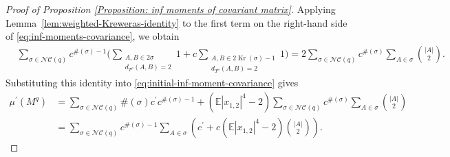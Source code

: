 \documentclass{article}
\theoremstyle{definition}
\newcommand{\NC}{\mathcal{NC}}
\begin{document}
{\begin{proof}[Proof of Proposition \ref{Proposition: inf moments of covariant matrix}]
Applying Lemma~\ref{lem:weighted-Kreweras-identity} to the first
term on the right-hand side of
\eqref{eq:inf-moments-covariance}, we obtain
\begin{align*}
&\sum_{\sigma\in\NC(q)}
c^{\#(\sigma)-1}
\Bigg(
\sum_{\substack{A,B\in 2\sigma\\
d_{T^\rho}(A,B)=2}}
1
+
c\sum_{\substack{A,B\in
2\operatorname{Kr}(\sigma)-1\\
d_{T^\rho}(A,B)=2}}
1
\Bigg)
=
2\sum_{\sigma\in\NC(q)}
c^{\#(\sigma)}
\sum_{A\in\sigma}\binom{|A|}{2}.
\end{align*}
Substituting this identity into
\eqref{eq:initial-inf-moment-covariance} gives
\begin{align*}
\mu^\prime(M^q)
&=
\sum_{\sigma\in\NC(q)}
\#(\sigma)c^\prime c^{\#(\sigma)-1}
+
(\mathbb{E}|x_{1,2}|^4-2)
\sum_{\sigma\in\NC(q)}
c^{\#(\sigma)}
\sum_{A\in\sigma}\binom{|A|}{2}
\\
&=
\sum_{\sigma\in\NC(q)}
c^{\#(\sigma)-1}
\sum_{A\in\sigma}
\left(
c^\prime
+
c(\mathbb{E}|x_{1,2}|^4-2)\binom{|A|}{2}
\right).
\end{align*}

\end{proof}}
\end{document}
